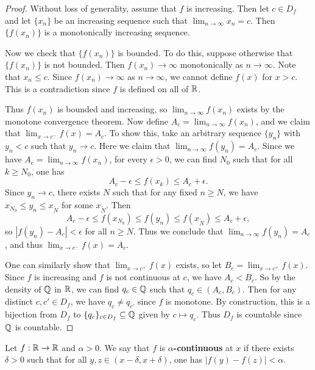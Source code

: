 \begin{proof}
  Without loss of generality, assume that $f$ is
  increasing.
  Then let $c \in D_f$ and let $\{x_n\}$ be an increasing
  sequence such that $\lim_{n \to \infty} x_n = c$.
  Then $\{f(x_n)\}$ is a monotonically increasing
  sequence.

  Now we check that $\{f(x_n)\}$ is bounded.
  To do this, suppose otherwise that
  $\{f(x_n)\}$ is not bounded.
  Then $f(x_n) \to \infty$ monotonically as $n \to \infty$.
  Note that $x_n \le c$. Since $f(x_n) \to \infty$
  as $n \to \infty$, we cannot define $f(x)$ for
  $x > c$. This is a contradiction since $f$ is
  defined on all of $\mathbb{R}$.

  Thus $f(x_n)$ is bounded
  and increasing, so $\lim_{n \to \infty} f(x_n)$
  exists by the monotone convergence theorem.
  Now define $A_c = \lim_{n \to \infty} f(x_n)$,
  and we claim that $\lim_{x \to c^-} f(x) = A_c$.
  To show this, take an arbitrary sequence
  $\{y_n\}$ with $y_n < c$ such that
  $y_n \to c$. Here we claim that
  $\lim_{n \to \infty} f(y_n) = A_c$. Since we have
  $A_c = \lim_{n \to \infty} f(x_n)$,
  for every $\epsilon > 0$, we can find $N_0$
  such that for all $k \ge N_0$, one has
  \[A_c - \epsilon \le f(x_k) \le A_c + \epsilon.\]
  Since $y_n \to c$, there exists $N$ such that
  for any fixed $n \ge N$, we have
  $x_{N_0} \le y_n \le x_{\widetilde{N}}$
  for some $x_{\widetilde{N}}$. Then
  \[A_c - \epsilon \le f(x_{N_0}) \le f(y_n) \le f(x_{\widetilde{N}}) \le A_c + \epsilon,\]
  so $|f(y_n) - A_c| < \epsilon$ for all $n \ge N$.
  Thus we conclude that
  $\lim_{n \to \infty} f(y_n) = A_c$, and thus
  $\lim_{x \to c^-} f(x) = A_c$.

  One can similarly show that
  $\lim_{x \to c^+} f(x)$ exists, so let
  $B_c = \lim_{x \to c^+} f(x)$. Since $f$ is
  increasing and $f$ is not continuous at $c$,
  we have $A_c < B_c$. So by the density of $\mathbb{Q}$ in
  $\mathbb{R}$, we can find $q_c \in \mathbb{Q}$ such that
  $q_c \in (A_c, B_c)$. Then for any distinct
  $c, c' \in D_f$,
  we have $q_c \ne q_{c'}$ since $f$ is monotone.
  By construction, this is a bijection from
  $D_f$ to $\{q_c\}_{c \in D_f} \subseteq \mathbb{Q}$ given
  by $c \mapsto q_c$. Thus $D_f$ is countable since
  $\mathbb{Q}$ is countable.
\end{proof}

\begin{definition}
  Let $f : \mathbb{R} \to \mathbb{R}$ and $\alpha > 0$. We say that
  $f$ is \textbf{$\alpha$-continuous} at $x$ if
  there exists $\delta > 0$ such that for all
  $y, z \in (x - \delta, x + \delta)$, one has
  $|f(y) - f(z)| < \alpha$.
\end{definition}

